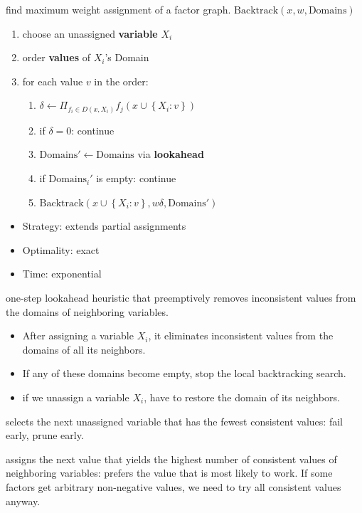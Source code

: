  find maximum weight assignment of a factor graph.
\textbf{$\text{Backtrack}(x, w, \text{Domains})$}
\begin{enumerate}
    \item choose an unassigned \textbf{variable} $X_i$ 
    \item order \textbf{values} of $X_i$'s Domain 
    \item for each value $v$ in the order:\begin{enumerate}
        \item $\delta \leftarrow \Pi_{f_i\in D(x,X_i)}f_j(x\cup\left\{X_i:v\right\})$
        \item if $\delta = 0$: continue
        \item $\text{Domains}' \leftarrow \text{Domains}$ via \textbf{lookahead} 
        \item if $\text{Domains}_i'$ is empty: continue
        \item \textbf{$\text{Backtrack}(x \cup \left\{X_i:v\right\}, w\delta, \text{Domains}')$}
    \end{enumerate}
\end{enumerate}
\begin{itemize}
    \item Strategy: extends partial assignments
    \item Optimality: exact
    \item Time: exponential
\end{itemize}

 one-step lookahead heuristic that preemptively removes
inconsistent values from the domains of neighboring variables.
\begin{itemize}
    \item After assigning a variable $X_i$, it eliminates inconsistent values from the domains of all its neighbors.
    \item If any of these domains become empty, stop the local backtracking search.
    \item if we unassign a variable $X_i$, have to restore the domain of its neighbors.
\end{itemize}

 selects the next unassigned
variable that has the fewest consistent values: fail early, prune early.

 assigns the next value that yields
the highest number of consistent values of neighboring variables: prefers the
value that is most likely to work.  If some factors get arbitrary non-negative values, we need to try
all consistent values anyway.

